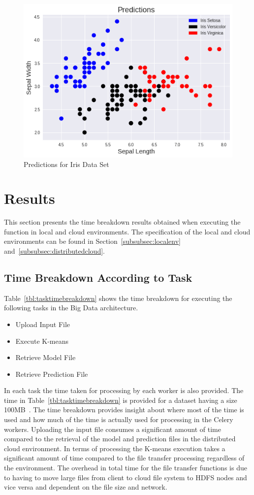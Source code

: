 \begin{figure}[htbp] 
	\centering
	\includegraphics[width=0.8\columnwidth]{images/irispredictions.png}
	\caption{Predictions for Iris Data Set}
\label{fig:irispredictions} 
\end{figure}

\section{Results}

This section presents the time breakdown results obtained when executing the 
function in local and cloud environments. The specification of the local and 
cloud environments can be found in Section~\ref{subsubsec:localenv} 
and~\ref{subsubsec:distributedcloud}.

\subsection{Time Breakdown According to Task}

Table~\ref{tbl:tasktimebreakdown} shows the time breakdown for executing the 
following tasks in the Big Data architecture.

\begin{itemize}
	\item Upload Input File 
	\item Execute K-means
	\item Retrieve Model File
	\item Retrieve Prediction File
\end{itemize}

In each task the time taken for processing by each worker is also provided. 
The time in Table~\ref{tbl:tasktimebreakdown} is provided for a dataset having 
a size 100MB~\cite{hid-sp18-416-www-iot-dataset}. The time breakdown provides 
insight about where most of the time is used and how much of the time is 
actually used for processing in the Celery workers. Uploading the input file 
consumes a significant amount of time compared to the retrieval of the model 
and prediction files in the distributed cloud environment. In terms of 
processing the K-means execution takes a significant amount of time compared 
to the file transfer processing regardless of the environment. The overhead in 
total time for the file transfer functions is due to having to move large 
files from client to cloud file system to HDFS nodes and vice versa and 
dependent on the file size and network.

